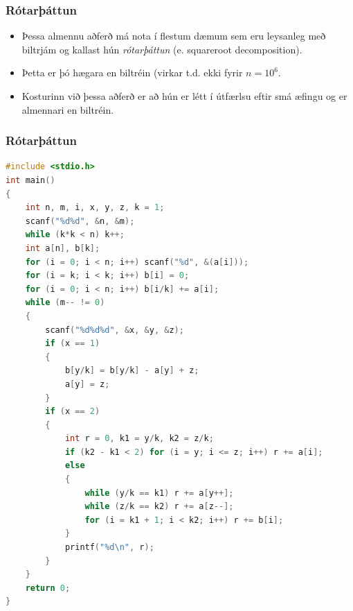 \documentclass[handout]{beamer}
\begin{document}
\begin{frame}
\frametitle{Rótarþáttun}
\begin{itemize}
	\item<1-> Þessa almennu aðferð má nota í flestum dæmum sem eru leysanleg með biltrjám og kallast hún \emph{rótarþáttun} (e. squareroot decomposition).
	\item<2-> Þetta er þó hægara en biltréin (virkar t.d. ekki fyrir $n = 10^6$.
	\item<3-> Kosturinn við þessa aðferð er að hún er létt í útfærlsu eftir smá æfingu og er almennari en biltréin.
\end{itemize}
\end{frame}

\begin{frame}[fragile]
	\frametitle{Rótarþáttun}
\tiny
\begin{lstlisting}[language=C++]
#include <stdio.h>
int main()
{
	int n, m, i, x, y, z, k = 1;
	scanf("%d%d", &n, &m);
	while (k*k < n) k++;
	int a[n], b[k];
	for (i = 0; i < n; i++) scanf("%d", &(a[i]));
	for (i = k; i < k; i++) b[i] = 0;
	for (i = 0; i < n; i++) b[i/k] += a[i];
	while (m-- != 0)
	{
		scanf("%d%d%d", &x, &y, &z);
		if (x == 1)
		{
			b[y/k] = b[y/k] - a[y] + z;
			a[y] = z;
		}
		if (x == 2)
		{
			int r = 0, k1 = y/k, k2 = z/k;
			if (k2 - k1 < 2) for (i = y; i <= z; i++) r += a[i];
			else
			{
				while (y/k == k1) r += a[y++];
				while (z/k == k2) r += a[z--];
				for (i = k1 + 1; i < k2; i++) r += b[i];
			}
			printf("%d\n", r);
		}
	}
	return 0;
}
\end{lstlisting}
\end{frame}
\end{document}
